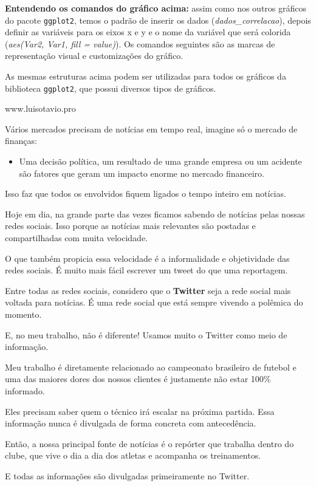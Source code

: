 \documentclass[
]{book}
\providecommand{\tightlist}{%
  \setlength{\itemsep}{0pt}\setlength{\parskip}{0pt}}
\begin{document}
\textbf{Entendendo os comandos do gráfico acima:} assim como nos outros
gráficos do pacote \texttt{ggplot2}, temos o padrão de inserir os dados
(\emph{dados\_correlacao}), depois definir as variáveis para os eixos x
e y e o nome da variável que será colorida (\emph{aes(Var2, Var1, fill =
value)}). Os comandos seguintes são as marcas de representação visual e
customizações do gráfico.

As mesmas estruturas acima podem ser utilizadas para todos os gráficos
da biblioteca \texttt{ggplot2}, que possui diversos tipos de gráficos.

www.luisotavio.pro

Vários mercados precisam de notícias em tempo real, imagine só o mercado
de finanças:

\begin{itemize}
\tightlist
\item
  Uma decisão política, um resultado de uma grande empresa ou um
  acidente são fatores que geram um impacto enorme no mercado
  financeiro.
\end{itemize}

Isso faz que todos os envolvidos fiquem ligados o tempo inteiro em
notícias.

Hoje em dia, na grande parte das vezes ficamos sabendo de notícias pelas
nossas redes sociais. Isso porque as notícias mais relevantes são
postadas e compartilhadas com muita velocidade.

O que também propicia essa velocidade é a informalidade e objetividade
das redes sociais. É muito mais fácil escrever um tweet do que uma
reportagem.

Entre todas as redes sociais, considero que o \textbf{Twitter} seja a
rede social mais voltada para notícias. É uma rede social que está
sempre vivendo a polêmica do momento.

E, no meu trabalho, não é diferente! Usamos muito o Twitter como meio de
informação.

Meu trabalho é diretamente relacionado ao campeonato brasileiro de
futebol e uma das maiores dores dos nossos clientes é justamente não
estar 100\% informado.

Eles precisam saber quem o técnico irá escalar na próxima partida. Essa
informação nunca é divulgada de forma concreta com antecedência.

Então, a nossa principal fonte de notícias é o repórter que trabalha
dentro do clube, que vive o dia a dia dos atletas e acompanha os
treinamentos.

E todas as informações são divulgadas primeiramente no Twitter.
\end{document}
